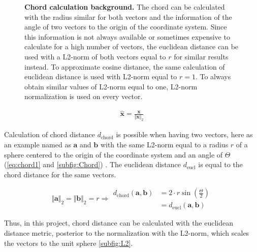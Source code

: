 \begin{figure}[!hbt]
\begin{subfigure}[b]{0.475\textwidth}
    \end{subfigure}
    \caption[Chord calculation background]{\textbf{Chord calculation background.} The chord can be calculated with the radius similar for both vectors and the information of the angle of two vectors to the origin of the coordinate system. Since this information is not always available or sometimes expensive to calculate for a high number of vectors, the euclidean distance can be used with a L2-norm of both vectors equal to $r$ for similar results instead. To approximate cosine distance, the same calculation of euclidean distance is used with L2-norm equal to $r = 1$. To always obtain similar values of L2-norm equal to one, L2-norm normalization is used on every vector.}
    \label{fig:L2_Normalisation_Background}
\end{figure}

\begin{equation}\label{eq:norm2}
    \begin{aligned}
        \mathbf{\hat{x}} = \frac{\mathbf{x}}{\Vert\mathbf{x}\Vert_2}
    \end{aligned}
\end{equation}

Calculation of chord distance $d_{\text{chord}}$ is possible when having two vectors, here as an example named as $\mathbf{a}$ and $\mathbf{b}$ with the same L2-norm equal to a radius $r$ of a sphere centered to the origin of the coordinate system and an angle of $\Theta$ (\autoref{eq:chord1} and \autoref{subfig:Chord}) \autocite{maor_trigonometric_2013}. The euclidean distance $d_{\text{eucl}}$ is equal to the chord distance for the same vectors.

\begin{equation}\label{eq:chord1}
    \Vert\mathbf{a}\Vert_2 = \Vert\mathbf{b}\Vert_2 = r \Rightarrow 
    \begin{aligned}
        d_{\text{chord}}(\mathbf{a},\mathbf{b}) &= 2 \cdot r \sin \left(\frac{\Theta}{2}\right)\\
        &= d_{\text{eucl}}(\mathbf{a},\mathbf{b})
    \end{aligned}
\end{equation}

Thus, in this project, chord distance can be calculated with the euclidean distance metric, posterior to the normalization with the L2-norm, which scales the vectors to the unit sphere \autoref{subfig:L2}. 

